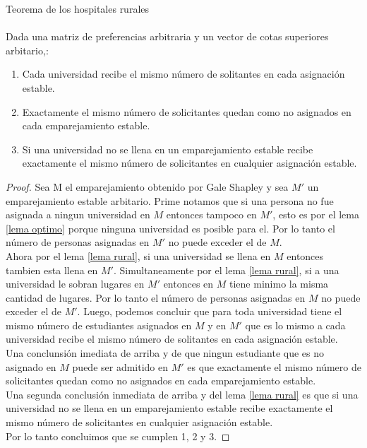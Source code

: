 \begin{teo}{Teorema de los hospitales rurales \\ }
\label{rural}
\cite{GaleSotomayor}\\
Dada una matriz de preferencias arbitraria y un vector de cotas superiores arbitario,:
\begin{enumerate}
\item Cada universidad recibe el mismo número de solitantes en cada asignación estable.
\item Exactamente el mismo número de solicitantes quedan como no asignados en cada emparejamiento estable. 
\item Si una universidad no se llena en un emparejamiento estable recibe exactamente el mismo número de solicitantes en cualquier asignación estable. 
\end{enumerate}
\end{teo}
\begin{proof}
Sea M el emparejamiento obtenido por Gale Shapley y sea $M'$ un emparejamiento estable arbitario. Prime notamos que si una persona no fue asignada a ningun universidad en $M$ entonces tampoco en $M'$, esto es por el lema \ref{lema optimo} porque ninguna universidad es posible para el. Por lo tanto el número de personas asignadas en $M'$ no puede exceder el de $M$. \\
Ahora por el lema \ref{lema rural}, si una universidad se llena en $M$ entonces tambien esta llena en $M'$.  Simultaneamente por el lema \ref{lema rural}, si a una universidad le sobran lugares en $M'$ entonces en $M$ tiene minimo la misma cantidad de lugares. Por lo tanto el número de personas asignadas en $M$ no puede exceder el de $M'$. Luego, podemos concluir que para toda universidad  tiene el mismo número de estudiantes asignados en $M$ y en $M'$ que es lo mismo a cada universidad recibe el mismo número de solitantes en cada asignación estable. \\
Una conclunsión imediata de arriba y de que ningun estudiante que es no asignado en $M$ puede ser admitido en $M'$ es que exactamente el mismo número de solicitantes quedan como no asignados en cada emparejamiento estable. \\
Una segunda conclusión inmediata de arriba y del lema \ref{lema rural} es que si una universidad no se llena en un emparejamiento estable recibe exactamente el mismo número de solicitantes en cualquier asignación estable.\\
Por lo tanto concluimos que se cumplen 1, 2 y 3.
\end{proof}

